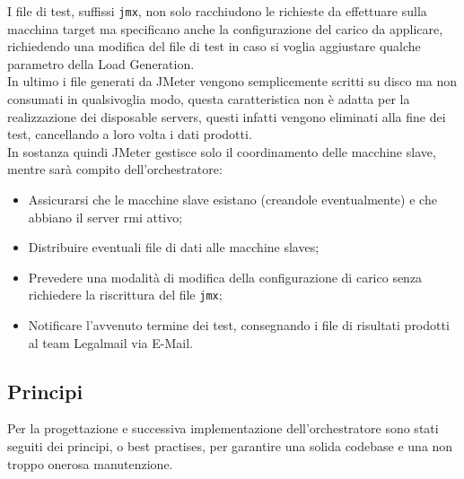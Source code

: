 I file di test, suffissi \texttt{jmx}, non solo racchiudono le richieste da effettuare sulla macchina target ma specificano anche la configurazione del carico da applicare, richiedendo una modifica del file di test in caso si voglia aggiustare qualche parametro della Load Generation. \\
In ultimo i file generati da JMeter vengono semplicemente scritti su disco ma non consumati in qualsivoglia modo, questa caratteristica non è adatta per la realizzazione dei disposable servers, questi infatti vengono eliminati alla fine dei test, cancellando a loro volta i dati prodotti. \\
In sostanza quindi JMeter gestisce solo il coordinamento delle macchine slave, mentre sarà compito dell'orchestratore:
\begin{itemize}
	\item Assicurarsi che le macchine slave esistano (creandole eventualmente) e che abbiano il server \gls{rmi} attivo;
	\item Distribuire eventuali file di dati alle macchine slaves;
	\item Prevedere una modalità di modifica della configurazione di carico senza richiedere la riscrittura del file \texttt{jmx};
	\item Notificare l'avvenuto termine dei test, consegnando i file di risultati prodotti al team Legalmail via E-Mail.
\end{itemize}
\subsection{Principi}
Per la progettazione e successiva implementazione dell'orchestratore sono stati seguiti dei principi, o best practises, per garantire una solida codebase e una non troppo onerosa manutenzione.
